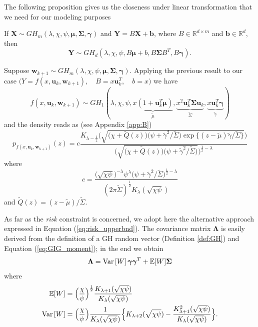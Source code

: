 The following proposition gives us the closeness under linear transformation that we need for our modeling purposes
\begin{proposition}
	If $\bm{X} \sim GH_m(\lambda,\chi,\psi,\bm{\mu},\bm{\Sigma},\bm{\gamma})$ and $\bm{Y}=B\bm{X}+\bm{b}$, where $B \in \mathbb{R}^{d\times m}$ and $\bm{b} \in \mathbb{R}^d$, then
	\[ \bm{Y} \sim GH_d(\lambda,\chi,\psi,B\bm{\mu}+b,B\bm{\Sigma}B^T,B\bm{\gamma}). \]
\end{proposition}
Suppose $\bm{w}_{k+1} \sim GH_m(\lambda,\chi,\psi,\bm{\mu},\bm{\Sigma},\bm{\gamma})$. Applying the previous result to our case $\big(Y = f(x,\bm{u}_k, \bm{w}_{k+1}),\quad B=x\bm{u}_k^T,\quad b = x\big)$ we have \[ f(x,\bm{u}_k,\bm{w}_{k+1}) \sim GH_1(\lambda,\chi,\psi,\underbrace{x(1+\bm{u}_k^T\bm{\mu})}_{\widetilde{\mu}},\underbrace{x^2\bm{u}_k^T\bm{\Sigma}\bm{u}_k}_{\widetilde{\Sigma}},\underbrace{x\bm{u}_k^T\bm{\gamma}}_{\widetilde{\gamma}}) \] and the density reads as (see Appendix  \ref{app:B})
\begin{equation}\label{eq:GHdensity}
\boxed{p_{f(x,\bm{u}_k, \bm{w}_{k+1})}(z) = c \frac{K_{\lambda-\frac{1}{2}}\Big(\sqrt{\big(\chi+\widetilde{Q}(z) \big)\big(\psi+\widetilde{\gamma}^2/\widetilde{\Sigma} \big)\exp\big\{(z-\widetilde{\mu})\widetilde{\gamma}/\widetilde{\Sigma} \big\}}\Big)}{\Big(\sqrt{\big(\chi+\widetilde{Q}(z) \big)\big(\psi+\widetilde{\gamma}^2/\widetilde{\Sigma} \big)}\Big)^{\frac{1}{2}-\lambda}}}
\end{equation}
where \[ c = \frac{\big(\sqrt{\chi\psi}\big)^{-\lambda}\psi^{\lambda}\big(\psi+\widetilde{\gamma}^2/\widetilde{\Sigma}\big)^{\frac{1}{2}-\lambda}}{(2\pi\widetilde{\Sigma})^{\frac{1}{2}}K_{\lambda}(\sqrt{\chi\psi})} \]
and $\widetilde{Q}(z)= (z-\widetilde{\mu})/\widetilde{\Sigma}$.


As far as the \textit{risk} constraint is concerned, we adopt here the alternative approach expressed in Equation (\ref{eq:risk_upperbnd}). The covariance matrix $\bm{\Lambda}$ is easily derived from the definition of a GH random vector (Definition \ref{def:GH}) and Equation (\ref{eq:GIG_moment}); in the end we obtain
\begin{equation}
\bm{\Lambda} = \operatorname{Var}\left[W\right]\bm{\gamma}\bm{\gamma}^T+\mathbb{E}[W]\bm{\Sigma}
\end{equation}
where
\begin{align*}
\mathbb{E}[W] & = \Big(\frac{\chi}{\psi}\Big)^{\frac{1}{2}}\frac{K_{\lambda+1}(\sqrt{\chi\psi})}{K_{\lambda}(\sqrt{\chi\psi})}\\
\operatorname{Var}\left[W\right] & = \Big(\frac{\chi}{\psi}\Big)\frac{1}{K_{\lambda}(\sqrt{\chi\psi})}\Big\{K_{\lambda+2}(\sqrt{\chi\psi})-\frac{K_{\lambda+1}^2(\sqrt{\chi\psi})}{K_{\lambda}(\sqrt{\chi\psi})} \Big\}.
\end{align*}



